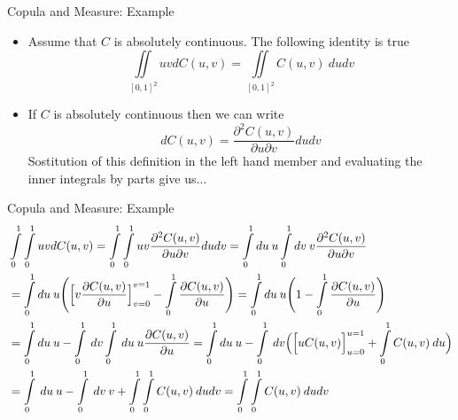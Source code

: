 \documentclass[11pt]{beamer}
\theoremstyle{plain}
\theoremstyle{definition}
\theoremstyle{remark}
\begin{document}
%
\begin{frame}{Copula and Measure: Example}
   \begin{itemize}
   	\item   				  						  
		Assume that $C$ is absolutely continuous. The following identity is true
		\begin{equation}
		\iint\limits_{[0, 1]^2} uv dC(u,v) = \iint\limits_{[0, 1]^2}  C(u,v) \> dudv 
		\end{equation}
	\item	
		If $C$ is absolutely continuous then we can write
			\begin{equation}
			dC(u, v) = \frac{\partial^2 C(u, v)}{\partial u \partial v} du dv
			\end{equation}
		Sostitution of this definition in the left hand member and evaluating the inner 		
		integrals by parts give us...
   \end{itemize}
\end{frame}%
%
\begin{frame}{Copula and Measure: Example}
   \footnotesize{
	\begin{equation}
	\begin{split}
	& \int\limits_0^1\int\limits_0^1 uv dC(u,v) = \int\limits_0^1\int\limits_0^1 uv 
	\frac{\partial^2 C(u, v)}{\partial u \partial v} du dv 
	= \int\limits_0^1 du \> u \int\limits_0^1 dv \> v \frac{\partial^2 C(u, v)}{\partial u 
	\partial v} \\
	& = \int\limits_0^1 du \> u \Biggl( \Bigl[ v \frac{\partial C(u, v)}{\partial u} 
	\Bigr]_{v=0}^{v=1} - \int\limits_0^1 \frac{\partial C(u, v)}{\partial u} \Biggr) 
	= \int\limits_0^1 du \> u \Biggl( 1 - \int\limits_0^1 \frac{\partial C(u, v)}{\partial 
	u} \Biggr) \\
	& = \int\limits_0^1 du \> u - \int\limits_0^1 \> dv \int\limits_0^1  \> du \> u 
	\frac{\partial C(u, v)}{\partial u} 
	= \int\limits_0^1 du \> u - \int\limits_0^1 \> dv \Bigl(\Bigl[ u C(u, v) \Bigr]_{u=0}
	^{u=1} + \int\limits_0^1 C(u,v) \> du \Bigl) \\ 
	& = \int\limits_0^1 \> du \> u - \int\limits_0^1 \> dv \> v + \int\limits_0^1 \int
	\limits_0^1 C(u,v) \> dudv = \int\limits_0^1 \int\limits_0^1 C(u,v) \> dudv  
	\end{split}
	\end{equation} 
  }
\end{frame}
\end{document}
